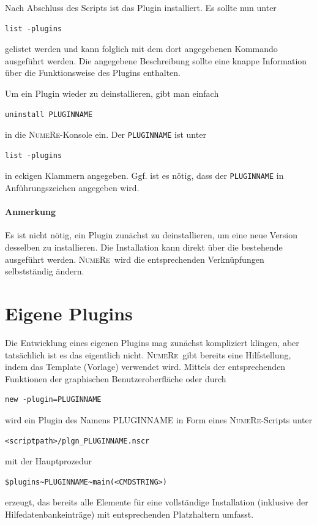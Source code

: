 \documentclass[DIV=14,headsepline,footsepline]{scrbook}
\newcommand{\NR}{\textsc{Nu\-me\-Re}}
\begin{document}
				Nach Abschluss des Scripts ist das Plugin installiert. Es sollte nun unter
				\begin{lstlisting}
list -plugins
				\end{lstlisting}
				gelistet werden und kann folglich mit dem dort angegebenen Kommando ausgeführt werden. Die angegebene Beschreibung sollte eine knappe Information über die Funktionsweise des Plugins enthalten.
				
				Um ein Plugin wieder zu deinstallieren, gibt man einfach
				\begin{lstlisting}
uninstall PLUGINNAME
				\end{lstlisting}
				in die \NR-Konsole ein. Der \lstinline+PLUGINNAME+ ist unter
				\begin{lstlisting}
list -plugins
				\end{lstlisting}
				in eckigen Klammern angegeben. Ggf. ist es nötig, dass der \lstinline+PLUGINNAME+ in Anführungszeichen angegeben wird.
				\paragraph{Anmerkung}
					Es ist nicht nötig, ein Plugin zunächst zu deinstallieren, um eine neue Version desselben zu installieren. Die Installation kann direkt über die bestehende ausgeführt werden. \NR\ wird die entsprechenden Verknüpfungen selbstständig ändern.
			\section{Eigene Plugins}
				Die Entwicklung eines eigenen Plugins mag zunächst kompliziert klingen, aber tatsächlich ist es das eigentlich nicht. \NR\ gibt bereits eine Hilfstellung, indem das Template (Vorlage) verwendet wird. Mittels der entsprechenden Funktionen der graphischen Benutzeroberfläche oder durch
				\begin{lstlisting}
new -plugin=PLUGINNAME
				\end{lstlisting}
				wird ein Plugin des Namens PLUGINNAME in Form eines \NR-Scripts unter
				\begin{lstlisting}
<scriptpath>/plgn_PLUGINNAME.nscr
				\end{lstlisting}
				mit der Hauptprozedur
				\begin{lstlisting}
$plugins~PLUGINNAME~main(<CMDSTRING>)
				\end{lstlisting}
				erzeugt, das bereits alle Elemente für eine vollständige Installation (inklusive der Hilfedatenbankeinträge) mit entsprechenden Platzhaltern umfasst.
				
\end{document}
